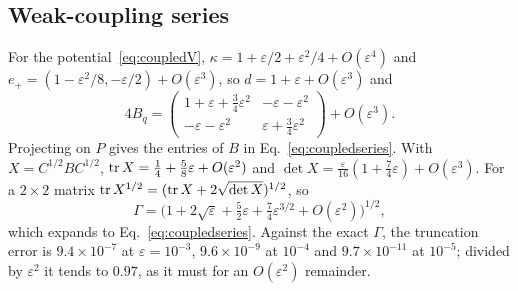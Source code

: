\subsection{Weak-coupling series}
\label{app:series}
For the potential~\eqref{eq:coupledV}, $\kappa = 1 + \varepsilon/2 + \varepsilon^2/4 + O(\varepsilon^4)$ and $e_+ = (1 - \varepsilon^2/8, -\varepsilon/2) + O(\varepsilon^3)$, so $d = 1 + \varepsilon + O(\varepsilon^3)$ and
\begin{equation}
4B_q = \begin{pmatrix} 1 + \varepsilon + \tfrac34\varepsilon^2 & -\varepsilon - \varepsilon^2 \\ -\varepsilon - \varepsilon^2 & \varepsilon + \tfrac34\varepsilon^2\end{pmatrix} + O(\varepsilon^3).
\end{equation}
Projecting on $P$ gives the entries of $B$ in Eq.~\eqref{eq:coupledseries}. With $X = C^{1/2}BC^{1/2}$, $\operatorname{tr} X = \tfrac14 + \tfrac58\varepsilon + O(\varepsilon^2)$ and $\det X = \tfrac{\varepsilon}{16}(1 + \tfrac74\varepsilon) + O(\varepsilon^3)$. For a $2\times2$ matrix $\operatorname{tr} X^{1/2} = (\operatorname{tr} X + 2\sqrt{\det X})^{1/2}$, so
\begin{equation}
\Gamma = \big(1 + 2\sqrt\varepsilon + \tfrac52\varepsilon + \tfrac74\varepsilon^{3/2} + O(\varepsilon^2)\big)^{1/2},
\end{equation}
which expands to Eq.~\eqref{eq:coupledseries}. Against the exact $\Gamma$, the truncation error is $9.4\times10^{-7}$ at $\varepsilon = 10^{-3}$, $9.6\times10^{-9}$ at $10^{-4}$ and $9.7\times10^{-11}$ at $10^{-5}$; divided by $\varepsilon^2$ it tends to $0.97$, as it must for an $O(\varepsilon^2)$ remainder.
